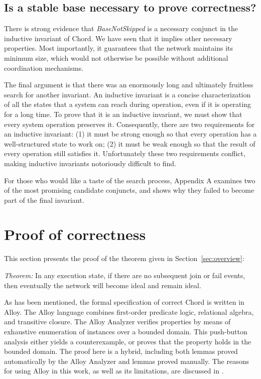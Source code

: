 \documentclass[conference]{IEEEtran}
\begin{document}
\subsection{Is a stable base necessary to prove correctness?}

There is strong evidence that {\it BaseNotSkipped} is a necessary
conjunct in the inductive invariant of Chord.
We have seen that it implies other necessary properties.
Most importantly,
it guarantees that the network maintains its minimum size, which
would not otherwise be possible without additional coordination
mechanisms.

The final argument is that there was an enormously long and
ultimately fruitless search for another invariant.
An inductive invariant is a concise characterization of all the states
that a system can reach during operation, even if it is operating
for a long time.
To prove that it is an inductive invariant, we must show that every
system operation preserves it.
Consequently, there are two requirements for an inductive invariant: 
(1) it must be strong enough so that every operation has a well-structured
state to work on;
(2) it must be weak enough so that the result of every operation still
satisfies it.
Unfortunately these two requirements conflict, making inductive
invariants notoriously difficult to find.

For those who would like a taste of the search process, Appendix A
examines two of the most promising candidate conjuncts, and shows
why they failed
to become part of the final invariant.

\section{Proof of correctness}
\label{sec:proof}

This section presents the proof of the theorem given in 
Section~\ref{sec:overview}:

{\it Theorem:} In any execution state, if there are
no subsequent join or fail events, then eventually the network will
become ideal and remain ideal.

As has been mentioned, the formal specification of correct Chord
is written in Alloy.
The Alloy language combines first-order predicate logic, relational
algebra, and transitive closure.
The Alloy Analyzer verifies properties by means of 
exhaustive enumeration of instances over a bounded domain.
This push-button analysis either yields a counterexample, or proves that
the property holds in the bounded domain.
The proof here is a hybrid, including both lemmas proved
automatically by the Alloy Analyzer and lemmas proved manually.
The reasons for using Alloy in this work, as well as its limitations,
are discussed in \cite{compare}.
\end{document}

